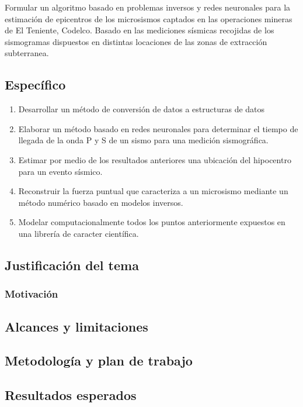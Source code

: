 Formular un algoritmo basado en problemas inversos y redes neuronales para la
estimación de epicentros de los microsismos captados en las operaciones mineras
de El Teniente, Codelco. Basado en las mediciones sísmicas recojidas de los
sismogramas dispuestos en distintas locaciones de las zonas de extracción
subterranea.


\subsection{Específico}

\begin{enumerate}
  \item Desarrollar un método de conversión de datos a estructuras de datos
  \item Elaborar un método basado en redes neuronales para determinar el
  tiempo de llegada de la onda P y S de un sismo para una medición sismográfica.
  \item Estimar por medio de los resultados anteriores una ubicación del
  hipocentro para un evento sísmico.
  \item Reconstruir la fuerza puntual que caracteriza a un microsismo mediante
  un método numérico basado en modelos inversos.
  \item Modelar computacionalmente todos los puntos anteriormente expuestos en
  una librería de caracter científica.
\end{enumerate}


\subsection{Justificación del tema}
\subsubsection{Motivación}

\subsection{Alcances y limitaciones}

\subsection{Metodología y plan de trabajo}

\subsection{Resultados esperados}

